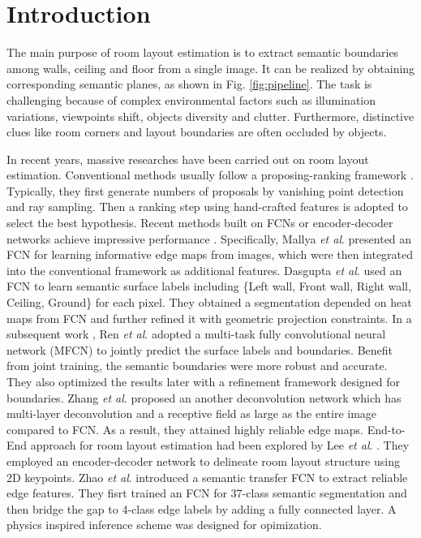 \section{Introduction}
\label{sec:intro}

The main purpose of room layout estimation is to extract semantic boundaries among walls, ceiling and floor from a single image. It can be realized by obtaining corresponding semantic planes, as shown in Fig. \ref{fig:pipeline}. The task is challenging because of complex environmental factors such as illumination variations, viewpoints shift, objects diversity and clutter. Furthermore, distinctive clues like room corners and layout boundaries are often occluded by objects. 

In recent years, massive researches have been carried out on room layout estimation. Conventional methods usually follow a proposing-ranking framework \cite{hedau2009recovering,wang2013discriminative,gupta2010estimating,hedau2010thinking}. Typically, they first generate numbers of proposals by vanishing point detection and ray sampling. Then a ranking step using hand-crafted features is adopted to select the best hypothesis. Recent methods built on FCNs \cite{long2015fully} or encoder-decoder networks achieve impressive performance \cite{mallya2015learning,ren2016coarse,zhang2017learning,dasgupta2016delay,LeeRoomNet17,zhao2017physics}. Specifically, 
%
Mallya \emph{et al}. \cite{mallya2015learning} presented an FCN for learning informative edge maps from images, which were then integrated into the conventional framework as additional features. 
%
Dasgupta \emph{et al}. \cite{dasgupta2016delay} used an FCN to learn semantic surface labels including \{Left wall, Front wall, Right wall, Ceiling, Ground\} for each pixel. They obtained a segmentation depended on heat maps from FCN and further refined it with geometric projection constraints.
% 
In a subsequent work \cite{ren2016coarse}, Ren \emph{et al}. adopted a multi-task fully convolutional neural network (MFCN) to jointly predict the surface labels and boundaries. Benefit from joint training, the semantic boundaries were more robust and accurate. They also optimized the results later with a refinement framework designed for boundaries.
% 
Zhang \emph{et al}. \cite{zhang2017learning} proposed an another deconvolution network which has multi-layer deconvolution and a receptive field as large as the entire image compared to FCN. As a result, they attained highly reliable edge maps. 
%
End-to-End approach for room layout estimation had been explored by Lee \emph{et al}. \cite{LeeRoomNet17}. They employed an encoder-decoder network to delineate room layout structure using 2D keypoints.
%
Zhao \emph{et al}. \cite{zhao2017physics} introduced a semantic transfer FCN to extract reliable edge features. They fisrt trained an FCN for 37-class semantic segmentation and then bridge the gap to 4-class edge labels by adding a fully connected layer. A physics inspired inference scheme was designed for opimization.



